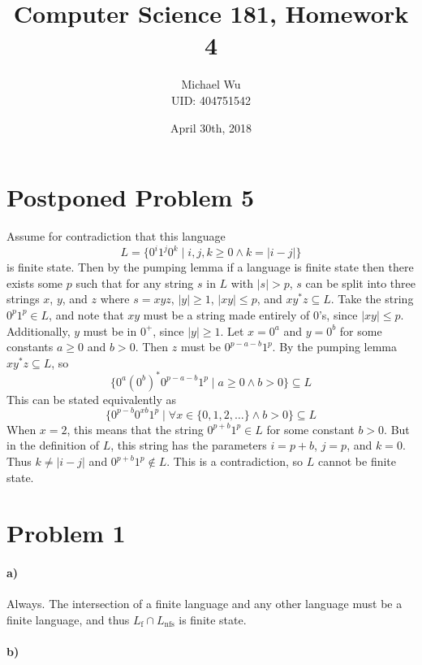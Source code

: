 \documentclass[12pt]{article}
\begin{document}
\title{Computer Science 181, Homework 4}
\date{April 30th, 2018}
\author{Michael Wu\\UID: 404751542}
\maketitle

\section*{Postponed Problem 5}

Assume for contradiction that this language
\[L=\{0^i1^j0^k\mid i,j,k\geq0 \wedge k=|i-j|\}\]
is finite state. Then by the pumping lemma if a language is finite state then there exists some \(p\) such that for any string \(s\) in
\(L\) with \(|s|>p\), \(s\) can be split into three strings \(x\), \(y\), and \(z\) where \(s=xyz\), \(|y|\geq 1\), \(|xy|\leq p\), and \(xy^*z\subseteq L\).
Take the string \(0^p1^p\in L\), and note that \(xy\) must be a string made entirely of \(0\)'s, since \(|xy|\leq p\). Additionally, \(y\) must be in \(0^+\),
since \(|y|\geq 1\). Let \(x=0^a\) and \(y=0^b\) for some constants \(a\geq 0\) and \(b>0\). Then \(z\) must be \(0^{p-a-b}1^p\). By the pumping lemma \(xy^*z\subseteq L\),
so
\[\{0^a(0^b)^*0^{p-a-b}1^p\mid a\geq0 \wedge b>0\}\subseteq L\]
This can be stated equivalently as
\[\{0^{p-b}0^{xb}1^p\mid\forall x\in\{0,1,2,\ldots\} \wedge b>0\}\subseteq L\]
When \(x=2\), this means that the string \(0^{p+b}1^p\in L\) for some constant \(b>0\). But in the definition of \(L\), this string has the parameters
\(i=p+b\), \(j=p\), and \(k=0\). Thus \(k\neq |i-j|\) and \(0^{p+b}1^p\notin L\). This is a contradiction, so \(L\) cannot be finite state.

\section{Problem 1}

\paragraph{a)}

Always. The intersection of a finite language and any other language must be a finite language, and thus \(L_\text{f} \cap L_\text{nfs}\) is finite state.

\paragraph{b)}
\end{document}
